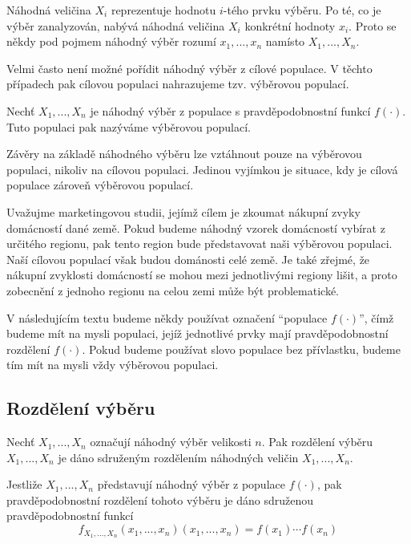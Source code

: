 Náhodná veličina $X_i$ reprezentuje hodnotu $i$-tého prvku výběru. Po té, co je výběr zanalyzován, nabývá náhodná veličina $X_i$ konkrétní hodnoty $x_i$. Proto se někdy pod pojmem náhodný výběr rozumí $x_1, ..., x_n$ namísto $X_1, ..., X_n$.

Velmi často není možné pořídit náhodný výběr z cílové populace. V těchto případech pak cílovou populaci nahrazujeme tzv. výběrovou populací.

\begin{definition}
Nechť $X_1, ..., X_n$ je náhodný výběr z populace s pravděpodobnostní funkcí $f(\cdot)$. Tuto populaci pak nazýváme výběrovou populací.
\end{definition}

Závěry na základě náhodného výběru lze vztáhnout pouze na výběrovou populaci, nikoliv na cílovou populaci. Jedinou vyjímkou je situace, kdy je cílová populace zároveň výběrovou populací.

\begin{example}
Uvažujme marketingovou studii, jejímž cílem je zkoumat nákupní zvyky domácností dané země. Pokud budeme náhodný vzorek domácností vybírat z určitého regionu, pak tento region bude představovat naši výběrovou populaci. Naší cílovou populací však budou dománosti celé země. Je také zřejmé, že nákupní zvyklosti domácností se mohou mezi jednotlivými regiony lišit, a proto zobecnění z jednoho regionu na celou zemi může být problematické.
\end{example}

V následujícím textu budeme někdy používat označení ``populace $f(\cdot)$'', čímž budeme mít na mysli populaci, jejíž jednotlivé prvky mají pravděpodobnostní rozdělení $f(\cdot)$. Pokud budeme používat slovo populace bez přívlastku, budeme tím mít na mysli vždy výběrovou populaci.

\subsection{Rozdělení výběru}

\begin{definition}
Nechť $X_1, ..., X_n$ označují náhodný výběr velikosti $n$. Pak rozdělení výběru $X_1, ..., X_n$ je dáno sdruženým rozdělením náhodných veličin $X_1, ..., X_n$.
\end{definition}

\begin{definition}
Jestliže $X_1, ..., X_n$ představují náhodný výběr z populace $f(\cdot)$, pak pravděpodobnostní rozdělení tohoto výběru je dáno sdruženou pravděpodobnostní funkcí
\begin{equation*}
f_{X_1, ..., X_n}(x_1, ..., x_n)(x_1, ..., x_n) = f(x_1) \cdots f(x_n)
\end{equation*}
\end{definition}

